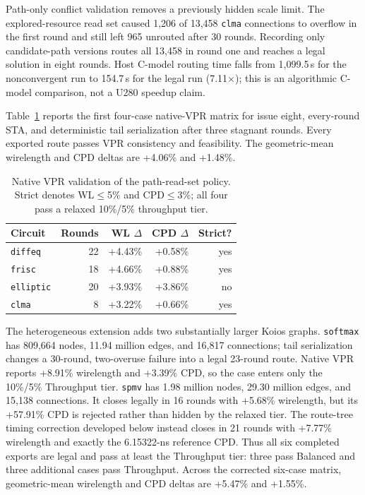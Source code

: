 \documentclass[sigconf,anonymous,review]{acmart}
\begin{document}
Path-only conflict validation removes a previously hidden scale limit. The
explored-resource read set caused 1,206 of 13,458 \texttt{clma} connections to
overflow in the first round and still left 965 unrouted after 30 rounds.
Recording only candidate-path versions routes all 13,458 in round one and
reaches a legal solution in eight rounds. Host C-model routing time falls from
1,099.5\,s for the nonconvergent run to 154.7\,s for the legal run (7.11$\times$);
this is an algorithmic C-model comparison, not a U280 speedup claim.

Table~\ref{tab:pathreads-qor} reports the first four-case native-VPR matrix for
issue eight, every-round STA, and deterministic tail serialization after three
stagnant rounds. Every exported route passes VPR consistency and feasibility.
The geometric-mean wirelength and CPD deltas are +4.06\% and +1.48\%.

\begin{table}[t]
\centering
\small
\begin{tabular}{lrrrr}
\toprule
Circuit & Rounds & WL $\Delta$ & CPD $\Delta$ & Strict? \\
\midrule
\texttt{diffeq}  & 22 & +4.43\% & +0.58\% & yes \\
\texttt{frisc}   & 18 & +4.66\% & +0.88\% & yes \\
\texttt{elliptic}& 20 & +3.93\% & +3.86\% & no \\
\texttt{clma}    &  8 & +3.22\% & +0.66\% & yes \\
\bottomrule
\end{tabular}
\caption{Native VPR validation of the path-read-set policy. Strict denotes
WL$\leq$5\% and CPD$\leq$3\%; all four pass a relaxed 10\%/5\% throughput tier.}
\label{tab:pathreads-qor}
\end{table}

The heterogeneous extension adds two substantially larger Koios graphs.
\texttt{softmax} has 809,664 nodes, 11.94 million edges, and 16,817
connections; tail serialization changes a 30-round, two-overuse failure into a
legal 23-round route. Native VPR reports +8.91\% wirelength and +3.39\% CPD, so
the case enters only the 10\%/5\% Throughput tier. \texttt{spmv} has 1.98
million nodes, 29.30 million edges, and 15,138 connections. It closes legally
in 16 rounds with +5.68\% wirelength, but its +57.91\% CPD is rejected rather
than hidden by the relaxed tier. The route-tree timing correction developed
below instead closes in 21 rounds with +7.77\% wirelength and exactly the
6.15322-ns reference CPD. Thus all six completed exports are legal and pass at
least the Throughput tier: three pass Balanced and three additional cases pass
Throughput. Across the corrected six-case matrix, geometric-mean wirelength
and CPD deltas are +5.47\% and +1.55\%.
\end{document}
